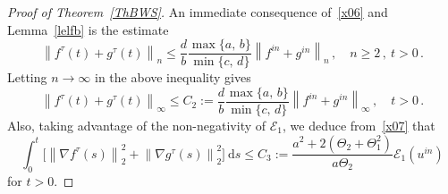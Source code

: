 \documentclass[AHL,Unicode,longabstracts,published]{cedram}
\newcommand{\clE}{\mathcal{E}}
\newcommand{\rmd}{\mathrm{d}}
\newcommand{\clE}{\mathcal{E}}
\begin{document}
\begin{proof}[Proof of Theorem~\ref{ThBWS}]
An immediate consequence of~\eqref{x06} and Lemma~\ref{lelfb} is the estimate
\begin{equation*}
\left\|f^\tau(t)+g^\tau(t)\right\|_n \le \frac{d}{b}\frac{\max\{a,\,b\}}{\min\{c,\, d\}}\left\|f^{in}+g^{in}\right\|_n\,, \quad n\ge 2\,, \ t>0\,.
\end{equation*}
Letting $n\to\infty$ in the above inequality gives
\begin{equation}\label{x08}
\left\|f^\tau(t)+g^\tau(t)\right\|_\infty \le C_2 := \frac{d}{b}\frac{\max\{a,\,b\}}{\min\{c,\, d\}} \left\|f^{in}+g^{in}\right\|_\infty\,, \quad t>0\,.
\end{equation}
Also, taking advantage of the non-negativity of $\clE_1$, we deduce from~\eqref{x07} that
\begin{equation}\label{x09}
\int_0^t \big[\left\|\nabla f^\tau(s)\right\|_2^2 + \left\|\nabla g^\tau(s)\right\|_2^2 \big]\ \rmd s\le C_3
:= \frac{a^2+2\left(\Theta_2+\Theta_1^2\right)}{a\Theta_2} \clE_1(u^{in})
\end{equation} 
for $t>0$.


\end{proof}
\end{document}
